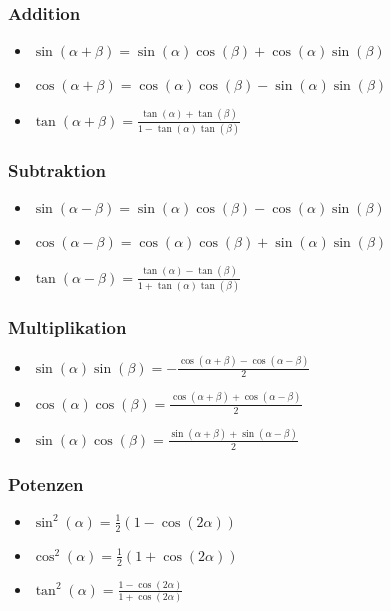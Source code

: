 \documentclass[8pt]{extarticle}
\begin{document}
\begin{multicols*}{3}
\subsubsection{Addition}
\begin{itemize}
 \item $\sin(\alpha + \beta) = \sin(\alpha) \cos(\beta) + \cos(\alpha) \sin(\beta)$
 \item $\cos(\alpha + \beta) = \cos(\alpha) \cos(\beta) - \sin(\alpha) \sin(\beta)$
 \item $\tan(\alpha + \beta) = \frac{\tan(\alpha) + \tan(\beta)}{1 - \tan(\alpha) \tan(\beta)}$
\end{itemize}

\subsubsection{Subtraktion}
\begin{itemize}
 \item $\sin(\alpha - \beta) = \sin(\alpha) \cos(\beta) - \cos(\alpha)\sin(\beta)$
 \item $\cos(\alpha - \beta) = \cos(\alpha) \cos(\beta) + \sin(\alpha)\sin(\beta)$
 \item $\tan(\alpha - \beta) = \frac{\tan(\alpha) - \tan(\beta)}{1+\tan(\alpha) \tan(\beta)}$
\end{itemize}

\subsubsection{Multiplikation}
\begin{itemize}
 \item $\sin(\alpha) \sin(\beta) = -\frac{\cos(\alpha + \beta) - \cos(\alpha - \beta)}{2}$
 \item $\cos(\alpha) \cos(\beta) =  \frac{\cos(\alpha + \beta) + \cos(\alpha - \beta)}{2}$
 \item $\sin(\alpha) \cos(\beta) =  \frac{\sin(\alpha + \beta) + \sin(\alpha - \beta)}{2}$
\end{itemize}

\subsubsection{Potenzen}
\begin{itemize}
 \item $\sin^2(\alpha) = \frac{1}{2}(1-\cos(2\alpha))$
 \item $\cos^2(\alpha) = \frac{1}{2}(1+\cos(2\alpha))$
 \item $\tan^2(\alpha) = \frac{1-\cos(2\alpha)}{1+\cos(2\alpha)}$
\end{itemize}


\end{multicols*}
\end{document}
